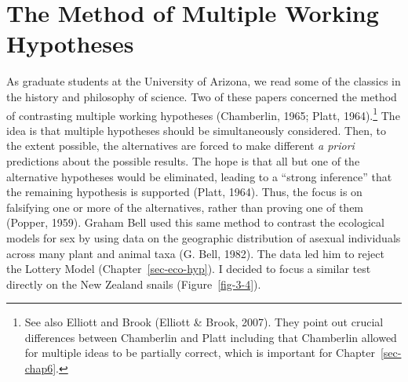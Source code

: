 \documentclass[
  letterpaper,
]{book}
\begin{document}
\hypertarget{the-method-of-multiple-working-hypotheses}{%
\section{The Method of Multiple Working
Hypotheses}\label{the-method-of-multiple-working-hypotheses}}

As graduate students at the University of Arizona, we read some of the
classics in the history and philosophy of science. Two of these papers
concerned the method of contrasting multiple working hypotheses
(Chamberlin, 1965; Platt, 1964).\footnote{See also Elliott and Brook
  (Elliott \& Brook, 2007). They point out crucial differences between
  Chamberlin and Platt including that Chamberlin allowed for multiple
  ideas to be partially correct, which is important for
  Chapter~\ref{sec-chap6}.} The idea is that multiple hypotheses should
be simultaneously considered. Then, to the extent possible, the
alternatives are forced to make different \emph{a priori} predictions
about the possible results. The hope is that all but one of the
alternative hypotheses would be eliminated, leading to a ``strong
inference'' that the remaining hypothesis is supported (Platt, 1964).
Thus, the focus is on falsifying one or more of the alternatives, rather
than proving one of them (Popper, 1959). Graham Bell used this same
method to contrast the ecological models for sex by using data on the
geographic distribution of asexual individuals across many plant and
animal taxa (G. Bell, 1982). The data led him to reject the Lottery
Model (Chapter~\ref{sec-eco-hyp}). I decided to focus a similar test
directly on the New Zealand snails (Figure~\ref{fig-3-4}).
\end{document}
